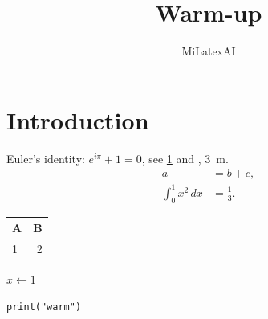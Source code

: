 \documentclass{article}
\title{Warm-up}
\author{MiLatexAI}
\begin{document}
\maketitle
\section{Introduction}\label{sec:intro}
Euler's identity: \(e^{i\pi} + 1 = 0\), see \cref{sec:intro} and \citet{warm}, \SI{3}{\metre}.
\begin{align}
  a &= b + c, \\
  \int_0^1 x^2 \, dx &= \tfrac{1}{3}.
\end{align}
\begin{table}[h]\centering
\begin{tabular}{lr}\toprule A & B \\ \midrule 1 & 2 \\ \bottomrule\end{tabular}
\end{table}
\begin{algorithmic}
\State $x \gets 1$
\end{algorithmic}
\begin{lstlisting}
print("warm")
\end{lstlisting}


\end{document}
